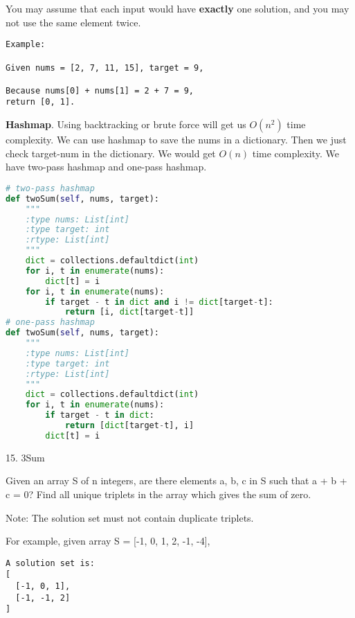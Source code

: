 \documentclass[../main.tex]{subfiles}
\begin{document}
You may assume that each input would have \textbf{exactly} one solution, and you may not use the same element twice.
\begin{lstlisting}
Example:

Given nums = [2, 7, 11, 15], target = 9,

Because nums[0] + nums[1] = 2 + 7 = 9,
return [0, 1].
\end{lstlisting}
\textbf{Hashmap}. Using backtracking or brute force will get us $O(n^2)$ time complexity. We can use hashmap to save the nums in a dictionary. Then we just check target-num in the dictionary. We would get $O(n)$ time complexity. We have two-pass hashmap and one-pass hashmap.
\begin{lstlisting}[language=Python]
# two-pass hashmap
def twoSum(self, nums, target):
    """
    :type nums: List[int]
    :type target: int
    :rtype: List[int]
    """
    dict = collections.defaultdict(int)
    for i, t in enumerate(nums):
        dict[t] = i
    for i, t in enumerate(nums):
        if target - t in dict and i != dict[target-t]:
            return [i, dict[target-t]]
# one-pass hashmap
def twoSum(self, nums, target):
    """
    :type nums: List[int]
    :type target: int
    :rtype: List[int]
    """
    dict = collections.defaultdict(int)
    for i, t in enumerate(nums):
        if target - t in dict:
            return [dict[target-t], i]
        dict[t] = i
\end{lstlisting}

15. 3Sum

Given an array S of n integers, are there elements a, b, c in S such that a + b + c = 0? Find all unique triplets in the array which gives the sum of zero.

Note: The solution set must not contain duplicate triplets.

For example, given array S = [-1, 0, 1, 2, -1, -4],
\begin{lstlisting}
A solution set is:
[
  [-1, 0, 1],
  [-1, -1, 2]
]
\end{lstlisting}
\end{document}
